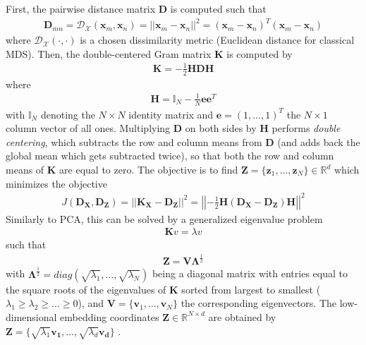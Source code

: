 First, the pairwise distance matrix $\bm{D}$ is computed such that 
\begin{align}
	\bm{D}_{mn} = \mathcal{D}_{\mathcal{X}}(\bm{x}_{m},\bm{x}_{n}) = ||\bm{x}_{m} - \bm{x}_{n} ||^{2} = (\bm{x}_{m} - \bm{x}_{n})^{T}(\bm{x}_{m} - \bm{x}_{n}) 
\end{align}
\noindent
where $\mathcal{D}_{\mathcal{X}}(\cdot,\cdot)$ is a chosen dissimilarity metric (Euclidean distance for classical MDS).  Then, the double-centered Gram matrix $\bm{K}$ is computed by
\begin{align}
	\bm{K}= -\frac{1}{2}\bm{H}\bm{D}\bm{H}
\end{align}
\noindent
where 
\begin{align}
	\bm{H}= \mathbb{I}_{N} - \frac{1}{N}\bm{e}\bm{e}^{T}
\end{align}
\noindent
with $\mathbb{I}_{N}$ denoting the $N \times N$ identity matrix and $\bm{e}= (1, \dots, 1)^{T}$ the $N \times 1$ column vector of all ones.  Multiplying $\bm{D}$ on both sides by $\bm{H}$ performs \textit{double centering}, which subtracts the row and column means from $\bm{D}$ (and adds back the global mean which gets subtracted twice), so that both the row and column means of $\bm{K}$ are equal to zero.  The objective is to find $\bm{Z}= \{\bm{z}_{1}, \dots, \bm{z}_{N}\} \in \mathbb{R}^{d}$ which minimizes the objective 
\begin{align}
	J(\bm{D}_{\bm{X}},\bm{D}_{\bm{Z}}) = ||\bm{K}_{\bm{X}} - \bm{D}_{\bm{Z}} ||^{2} = \left |\left|-\frac{1}{2} \bm{H} (\bm{D}_{\bm{X}} - \bm{D}_{\bm{Z}}) \bm{H} \right |\right|^{2}
\end{align}
Similarly to PCA, this can be solved by a generalized eigenvalue problem 
\begin{align}
	\bm{K}v = \lambda v
\end{align}
\noindent
such that 
\begin{align}
	\bm{Z} = \bm{V}\bm{\Lambda}^{\frac{1}{2}}
\end{align}
\noindent
with $\bm{\Lambda}^{\frac{1}{2}} = diag(\sqrt{\lambda_{1}},\dots,\sqrt{\lambda_N})$ being a diagonal matrix with entries equal to the square roots of the eigenvalues of $\bm{K}$ sorted from largest to smallest ($\lambda_{1} \geq  \lambda_{2} \geq \dots \geq 0$), and $\bm{V} = \{ \bm{v}_{1}, \dots, \bm{v}_{N} \}$ the corresponding eigenvectors.  The low-dimensional embedding coordinates $\bm{Z} \in \mathbb{R}^{N \times d}$ are obtained by $\bm{Z} = \{\sqrt{\lambda_{1}}\bm{v_{1}}, \dots, \sqrt{\lambda_{d}}\bm{v_{d}} \}$ \citep{Chao2019RecentAdvancesSupervisedDimRed}.


